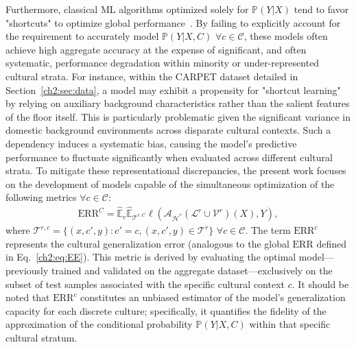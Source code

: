 Furthermore, classical ML algorithms optimized solely for $\mathbb{P}(Y|X)$ tend to favor "shortcuts" to optimize global performance~\citep{geirhos2020shortcut,cristianini2023shortcut}. 
By failing to explicitly account for the requirement to accurately model $\mathbb{P}(Y|X, C)$ $\forall c \in \mathcal{C}$, these models often achieve high aggregate accuracy at the expense of significant, and often systematic, performance degradation within minority or under-represented cultural strata.
For instance, within the CARPET dataset detailed in Section~\ref{ch2:sec:data}, a model may exhibit a propensity for "shortcut learning" by relying on auxiliary background characteristics rather than the salient features of the floor itself. 
This is particularly problematic given the significant variance in domestic background environments across disparate cultural contexts. 
Such a dependency induces a systematic bias, causing the model's predictive performance to fluctuate significantly when evaluated across different cultural strata.
To mitigate these representational discrepancies, the present work focuses on the development of models capable of the simultaneous optimization of the following metrics $\forall c \in \mathcal{C}$:
%
\begin{align}
\label{ch2:eq:EEC}
\text{ERR}^C = \hat{\mathbb{E}}_r
\hat{\mathbb{E}}_{ \mathcal{T}^{r,C}} \ell(\mathscr{A}_{\mathcal{H}^*}(\mathcal{L}^r {\cup} \mathcal{V}^r)(X),Y),
\end{align}
%
where $\mathcal{T}^{r,c} = \{ (x, c', y) : c' = c, (x, c', y) \in \mathcal{T}^r \}$ $\forall c \in \mathcal{C}$.
The term $\text{ERR}^c$ represents the cultural generalization error (analogous to the global $\text{ERR}$ defined in Eq.~\ref{ch2:eq:EE}). 
This metric is derived by evaluating the optimal model—previously trained and validated on the aggregate dataset—exclusively on the subset of test samples associated with the specific cultural context $c$. 
It should be noted that $\text{ERR}^c$ constitutes an unbiased estimator of the model's generalization capacity for each discrete culture; specifically, it quantifies the fidelity of the approximation of the conditional probability $\mathbb{P}(Y|X, C)$ within that specific cultural stratum.


